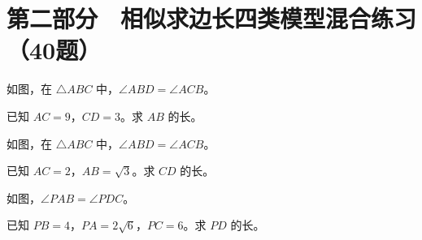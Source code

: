 \documentclass{exam-zh}
\begin{document}
\section*{第二部分　相似求边长四类模型混合练习（40题）}


\begin{problem}[points=10]
  \noindent
  \begin{minipage}[t]{\dimexpr\linewidth-60mm-6mm\relax}
    \vspace{0pt}
    如图，在 $\triangle ABC$ 中，$\angle ABD=\angle ACB$。

已知 $AC=9$，$CD=3$。求 $AB$ 的长。
    
  \end{minipage}\hfill
  \begin{diagramcoltikz}{60mm}{}
  }
  \end{diagramcoltikz}
  \par\medskip
  \answerarea[54mm]
\end{problem}



\begin{problem}[points=10]
  \noindent
  \begin{minipage}[t]{\dimexpr\linewidth-60mm-6mm\relax}
    \vspace{0pt}
    如图，在 $\triangle ABC$ 中，$\angle ABD=\angle ACB$。

已知 $AC=2$，$AB=\sqrt{3}$。求 $CD$ 的长。
    
  \end{minipage}\hfill
  \begin{diagramcoltikz}{60mm}{}
  }
  \end{diagramcoltikz}
  \par\medskip
  \answerarea[54mm]
\end{problem}



\begin{problem}[points=10]
  \noindent
  \begin{minipage}[t]{\dimexpr\linewidth-60mm-6mm\relax}
    \vspace{0pt}
    如图，$\angle PAB=\angle PDC$。

已知 $PB=4$，$PA=2\sqrt{6}$，$PC=6$。求 $PD$ 的长。
    
  \end{minipage}\hfill
  \begin{diagramcoltikz}{60mm}{}
  }
  \end{diagramcoltikz}
  \par\medskip
  \answerarea[54mm]
\end{problem}
\end{document}
